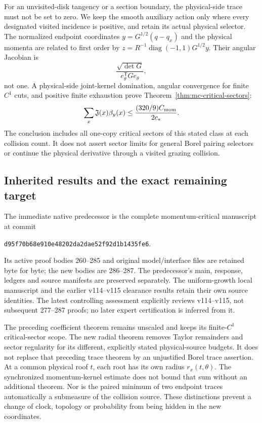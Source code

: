 \documentclass[11pt,reqno]{amsart}
\numberwithin{equation}{section}
\theoremstyle{definition}\newtheorem{definition}[theorem]{Definition}
\theoremstyle{remark}\newtheorem{remark}[theorem]{Remark}
\begin{document}
For an unvisited-disk tangency or a section boundary, the physical-side
trace must not be set to zero. We keep the smooth auxiliary action only
where every designated visited incidence is positive, and retain its
actual physical selector. The normalized endpoint coordinates
$y=G^{1/2}(q-q_x)$ and the physical momenta are related to first order by
$z=R^{-1}\operatorname{diag}(-1,1)G^{1/2}y$. Their angular Jacobian is
\[
 \frac{\sqrt{\det G}}{e_\theta^{\mathsf T}G e_\theta},
\]
not one. A physical-side joint-kernel domination, angular convergence for
finite $C^1$ cuts, and positive finite exhaustion prove
Theorem~\ref{thm:mc-critical-sectors}:
\[
 \sum_x\mathfrak J(x)\beta_y(x)
                    \le\frac{(320/9)C_{\rm mom}}{2c_*}.
\]
The conclusion includes all one-copy critical sectors of this stated
class at each collision count. It does not assert sector limits for
general Borel pairing selectors or continue the physical derivative
through a visited grazing collision.

\subsection*{Inherited results and the exact remaining target}
The immediate native predecessor is the complete momentum-critical
manuscript at commit
\begin{center}
\texttt{d95f70b68e910e48202da2dae52f92d1b1435fe6}.
\end{center}
Its active proof bodies 260--285 and original model/interface files are
retained byte for byte; the new bodies are 286--287. The predecessor's main,
response, ledgers and source manifests are preserved separately.
The uniform-growth local manuscript and the earlier v114--v115
clearance results retain their own source identities. The latest
controlling assessment explicitly reviews v114--v115, not subsequent
277--287 proofs; no later expert certification is inferred from it.

The preceding coefficient theorem remains unscaled and keeps its
finite-$C^1$ critical-sector scope. The new radial theorem removes
Taylor remainders and sector regularity for its different, explicitly
stated physical-source budgets. It does not replace that preceding
trace theorem by an unjustified Borel trace assertion. At a common
physical roof $t$, each root has its own radius $r_x(t,\theta)$.
The synchronized momentum-kernel estimate does not bound that sum
without an additional theorem. Nor is the paired minimum of two
endpoint traces automatically a submeasure of the collision source.
These distinctions prevent a change of clock, topology or probability
from being hidden in the new coordinates.
\end{document}
